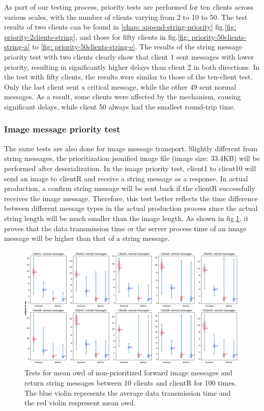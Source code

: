 As part of our testing process, priority tests are performed for ten clients across 
various scales, with the number of clients varying from 2 to 10 to 50. The test results 
of two clients can be found in \ref{chap: append-string-priority} fig.\ref{fig: priority-2clients-string}, 
and those for fifty clients in fig.\ref{fig: priority-50clients-string-a} to 
\ref{fig: priority-50clients-string-e}.  The results of the string message priority 
test with two clients clearly show that client 1 sent messages with lower priority, 
resulting in significantly higher delays than client 2 in both directions. In the test 
with fifty clients, the results were similar to those of the ten-client test. Only the 
last client sent a critical message, while the other 49 sent normal messages. As a 
result, some clients were affected by the mechanism, causing significant delays, while 
client 50 always had the smallest round-trip time.

\subsubsection{Image message priority test}
The same tests are also done for image message transport. Slightly different from string 
messages, the prioritization jsonified image file (image size: 33.4KB) will be performed 
after deserialization. In the image priority test, client1 to client10 will send an image 
to clientR and receive a string message as a response. In actual production, a confirm 
string message will be sent back if the clientR successfully receives the image message. 
Therefore, this test better reflects the time difference between different message types 
in the actual production process since the actual string length will be much smaller than 
the image length. As shown in fig.\ref{fig: priority-10clients-c}, it proves that the data 
transmission time or the server process time of an image message 
will be higher than that of a string message.


\begin{figure}
    \centering
    \includegraphics[width=\textheight]{figures/tests/priority_tests/violin_10clients_image_non_priority.png}\hfill 
    \caption{Tests for mean \gls{owd} of non-prioritized forward image messages and return string messages between 10 clients 
    and clientR for 100 times. The blue violin represents the average data transmission time and the red violin 
    respresent mean \gls{owd}.} \label{fig: priority-10clients-c}
\end{figure}


